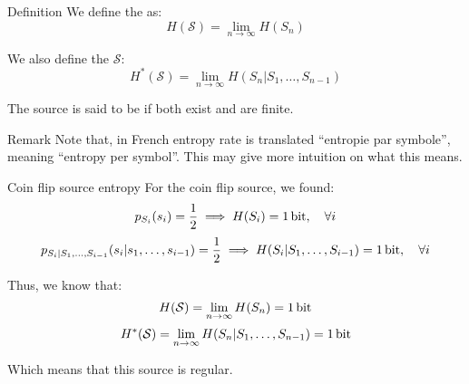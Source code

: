 \documentclass[a4paper]{article}
\begin{document}
\begin{parag}{Definition}
    We define the  as:
    \[H\left(\mathcal{S}\right) = \lim_{n \to \infty} H\left(S_n\right)\]

    We also define the  $\mathcal{S}$:
    \[H^*\left(\mathcal{S}\right) = \lim_{n \to \infty} H\left(S_n | S_1, \ldots, S_{n-1}\right)\]

    The source is said to be  if both exist and are finite.

    \begin{subparag}{Remark}
        Note that, in French entropy rate is translated ``entropie par symbole'', meaning ``entropy per symbol''. This may give more intuition on what this means.
    \end{subparag}
    
\end{parag}

\begin{parag}{Coin flip source entropy}
    For the coin flip source, we found: 
    \[p_{S_i}\left(s_i\right) = \frac{1}{2} \implies H\left(S_i\right) = \SI{1}{\bit}, \mathspace \forall i\]
    \[p_{S_i | S_1, \ldots, S_{i-1}}\left(s_i | s_1, \ldots, s_{i-1}\right) = \frac{1}{2} \implies H\left(S_i | S_{1}, \ldots, S_{i-1}\right) = \SI{1}{\bit}, \mathspace \forall i\]

    Thus, we know that: 
    \[H\left(\mathcal{S}\right) = \lim_{n \to \infty} H\left(S_n\right) = \SI{1}{\bit}\]
    \[H^*\left(\mathcal{S}\right) = \lim_{n \to \infty} H\left(S_n | S_1, \ldots, S_{n-1}\right) = \SI{1}{\bit}\]

    Which means that this source is regular.
\end{parag}
\end{document}
